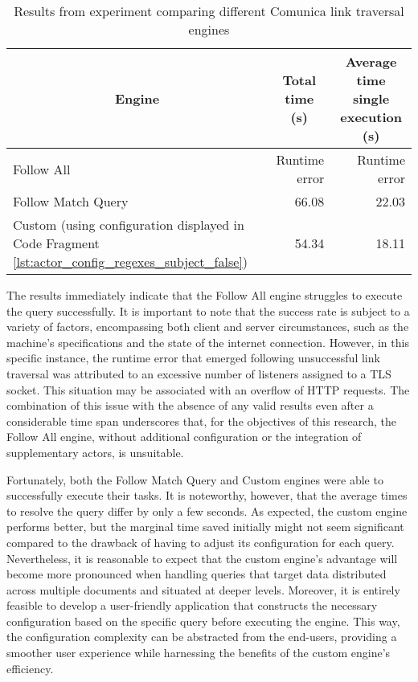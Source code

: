 \begin{table}[htbp]
    \centering
    \caption{Results from experiment comparing different Comunica link traversal engines}
    \label{tab:results_engines}
    \begin{tabular}{lrr}
        \toprule
        \multicolumn{1}{c}{Engine} & \multicolumn{1}{c}{Total time (s)} & \multicolumn{1}{c}{Average time single execution (s)} \\
        \midrule
        Follow All & Runtime error & Runtime error \\
        Follow Match Query & 66.08 & 22.03 \\
        Custom (using configuration displayed in Code Fragment \ref{lst:actor_config_regexes_subject_false}) & 54.34 & 18.11 \\
        \bottomrule
    \end{tabular}
\end{table}

The results immediately indicate that the Follow All engine struggles to execute the query successfully. It is important to note that the success rate is subject to a variety of factors, encompassing both client and server circumstances, such as the machine's specifications and the state of the internet connection. However, in this specific instance, the runtime error that emerged following unsuccessful link traversal was attributed to an excessive number of listeners assigned to a TLS socket. This situation may be associated with an overflow of HTTP requests. The combination of this issue with the absence of any valid results even after a considerable time span underscores that, for the objectives of this research, the Follow All engine, without additional configuration or the integration of supplementary actors, is unsuitable.

Fortunately, both the Follow Match Query and Custom engines were able to successfully execute their tasks. It is noteworthy, however, that the average times to resolve the query differ by only a few seconds. As expected, the custom engine performs better, but the marginal time saved initially might not seem significant compared to the drawback of having to adjust its configuration for each query. Nevertheless, it is reasonable to expect that the custom engine's advantage will become more pronounced when handling queries that target data distributed across multiple documents and situated at deeper levels. Moreover, it is entirely feasible to develop a user-friendly application that constructs the necessary configuration based on the specific query before executing the engine. This way, the configuration complexity can be abstracted from the end-users, providing a smoother user experience while harnessing the benefits of the custom engine's efficiency.

